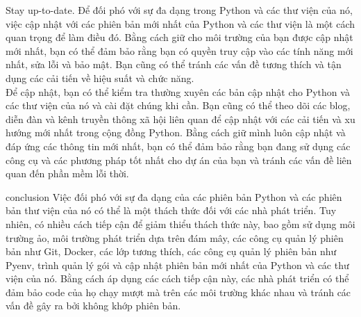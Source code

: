 \documentclass[12pt]{amsart}
\begin{document}
\begin{section}{Stay up-to-date.}
    Để đối phó với sự đa dạng trong Python và các thư viện của nó, việc cập nhật với các phiên bản mới nhất của Python và các thư viện là một cách quan trọng để làm điều đó. Bằng cách giữ cho môi trường của bạn được cập nhật mới nhất, bạn có thể đảm bảo rằng bạn có quyền truy cập vào các tính năng mới nhất, sửa lỗi và bảo mật. Bạn cũng có thể tránh các vấn đề tương thích và tận dụng các cải tiến về hiệu suất và chức năng. \\
    
    Để cập nhật, bạn có thể kiểm tra thường xuyên các bản cập nhật cho Python và các thư viện của nó và cài đặt chúng khi cần. Bạn cũng có thể theo dõi các blog, diễn đàn và kênh truyền thông xã hội liên quan để cập nhật với các cải tiến và xu hướng mới nhất trong cộng đồng Python. Bằng cách giữ mình luôn cập nhật và đáp ứng các thông tin mới nhất, bạn có thể đảm bảo rằng bạn đang sử dụng các công cụ và các phương pháp tốt nhất cho dự án của bạn và tránh các vấn đề liên quan đến phần mềm lỗi thời.
\end{section}
\begin{section}{conclusion}
    Việc đối phó với sự đa dạng của các phiên bản Python và các phiên bản thư viện của nó có thể là một thách thức đối với các nhà phát triển. Tuy nhiên, có nhiều cách tiếp cận để giảm thiểu thách thức này, bao gồm sử dụng môi trường ảo, môi trường phát triển dựa trên đám mây, các công cụ quản lý phiên bản như Git, Docker, các lớp tương thích, các công cụ quản lý phiên bản như Pyenv, trình quản lý gói và cập nhật phiên bản mới nhất của Python và các thư viện của nó. Bằng cách áp dụng các cách tiếp cận này, các nhà phát triển có thể đảm bảo code của họ chạy mượt mà trên các môi trường khác nhau và tránh các vấn đề gây ra bởi không khớp phiên bản.
\end{section}
\end{document}

